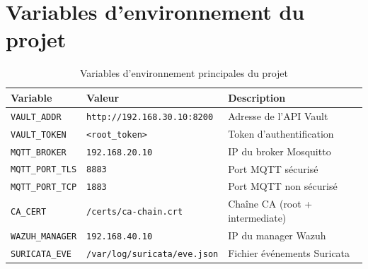 \section{Variables d'environnement du projet}
\label{sec:config_env}

\begin{table}[H]
\centering
\caption{Variables d'environnement principales du projet}
\label{tab:env_vars}
\begin{tabular}{llp{6cm}}
\toprule
\textbf{Variable} & \textbf{Valeur} & \textbf{Description} \\
\midrule
\texttt{VAULT\_ADDR} & \texttt{http://192.168.30.10:8200} & Adresse de l'API Vault \\
\texttt{VAULT\_TOKEN} & \texttt{<root\_token>} & Token d'authentification \\
\texttt{MQTT\_BROKER} & \texttt{192.168.20.10} & IP du broker Mosquitto \\
\texttt{MQTT\_PORT\_TLS} & \texttt{8883} & Port MQTT sécurisé \\
\texttt{MQTT\_PORT\_TCP} & \texttt{1883} & Port MQTT non sécurisé \\
\texttt{CA\_CERT} & \texttt{/certs/ca-chain.crt} & Chaîne CA (root + intermediate) \\
\texttt{WAZUH\_MANAGER} & \texttt{192.168.40.10} & IP du manager Wazuh \\
\texttt{SURICATA\_EVE} & \texttt{/var/log/suricata/eve.json} & Fichier événements Suricata \\
\bottomrule
\end{tabular}
\end{table}
